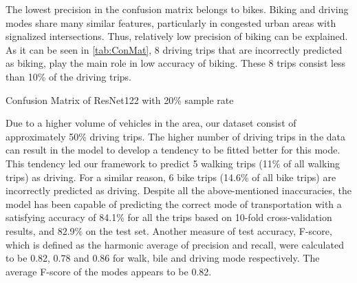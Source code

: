 The lowest precision in the confusion matrix belongs to bikes. Biking and driving modes share many similar features, particularly in congested urban areas with signalized intersections. Thus, relatively low precision of biking can be explained. As it can be seen in \cref{tab:ConMat}, 8 driving trips that are incorrectly predicted as biking, play the main role in low accuracy of biking. These 8 trips consist less than 10\% of the driving trips. 
\begin{table}[!ht]
\centering
\caption{Confusion Matrix of ResNet122 with 20\% sample rate} 
\small
{}
\label{tab:ConMat}
\end{table}
Due to a higher volume of vehicles in the area, our dataset consist of approximately 50\% driving trips. The higher number of driving trips in the data can result in the model to develop a tendency to be fitted better for this mode. This tendency led our framework to predict 5 walking trips (11\% of all walking trips) as driving. For a similar reason, 6 bike trips (14.6\% of all bike trips) are incorrectly predicted as driving. Despite all the above-mentioned inaccuracies, the model has been capable of predicting the correct mode of transportation with a satisfying accuracy of 84.1\% for all the trips based on 10-fold cross-validation results, and 82.9\% on the test set. Another measure of test accuracy, F-score, which is defined as the harmonic average of precision and recall, were calculated to be 0.82, 0.78 and 0.86 for walk, bile and driving mode respectively. The average F-score of the modes appears to be 0.82.
